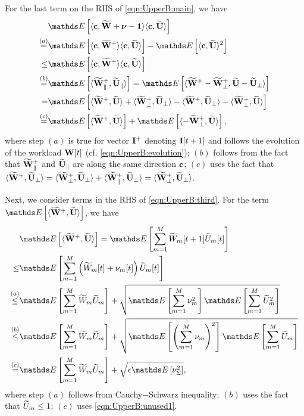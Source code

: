 \documentclass[10pt, conference, letterpaper]{IEEEtran} %
\begin{document}
For the last term on the RHS of \eqref{eqn:UpperB:main}, we have
\begin{align}
\label{eqn:UpperB:third}
&\bE\left[\langle\mb{c},\wt{\mb{W}}+\bs{\nu}-\mb{1}\rangle\langle\mb{c},\wt{\mb{U}}\rangle\right] \nonumber\\
\stackrel{(a)}{=}&\bE\left[\langle\mb{c},\wt{\mb{W}}^{+}\rangle\langle\mb{c},\wt{\mb{U}}\rangle\right]-\bE\left[\langle\mb{c},\wt{\mb{U}}\rangle^2\right]\nonumber\\
\leq&\bE\left[\langle\mb{c},\wt{\mb{W}}^{+}\rangle\langle\mb{c},\wt{\mb{U}}\rangle\right]\nonumber\\
\stackrel{(b)}{=}&\bE\left[\langle\wt{\mb{W}}^{+}_{\parallel},\wt{\mb{U}}_{\parallel}\rangle\right] =\bE\left[\langle\wt{\mb{W}}^{+}-\wt{\mb{W}}^{+}_{\perp},\wt{\mb{U}}-\wt{\mb{U}}_{\perp}\rangle\right]\nonumber\\
=&\bE\left[\langle\wt{\mb{W}}^{+},\wt{\mb{U}}\rangle+\langle\wt{\mb{W}}^{+}_{\perp},\wt{\mb{U}}_{\perp}\rangle-\langle\wt{\mb{W}}^{+},\wt{\mb{U}}_{\perp}\rangle-\langle\wt{\mb{W}}_{\perp}^{+},\wt{\mb{U}}\rangle\right]\nonumber\\
\stackrel{(c)}{=}&\bE\left[\langle\wt{\mb{W}}^{+},\wt{\mb{U}}\rangle\right]+\bE\left[\langle-\wt{\mb{W}}^{+}_{\perp},\wt{\mb{U}}\rangle\right],
\end{align}
where step $(a)$ is true for vector $\mathbf{I}^{+}$ denoting $\mathbf{I}[t+1]$ and follows the evolution of the workload $\mathbf{W}[t]$ (cf. \eqref{eqn:UpperB:evolution}); $(b)$ follows from the fact that $\widetilde{\mathbf{W}}_{\parallel}^{+}$ and $\widetilde{\mathbf{U}}_{\parallel}$ are along the same direction $\mathbf{c}$; $(c)$ uses the fact that $\langle\widetilde{\mathbf{W}}^{+},\widetilde{\mathbf{U}}_{\perp}\rangle=\langle\widetilde{\mathbf{W}}^{+}_{\perp},\widetilde{\mathbf{U}}_{\perp}\rangle+\langle\widetilde{\mathbf{W}}^{+}_{\parallel},\widetilde{\mathbf{U}}_{\perp}\rangle=\langle\widetilde{\mathbf{W}}^{+}_{\perp},\widetilde{\mathbf{U}}_{\perp}\rangle$.

Next, we consider terms in the RHS of \eqref{eqn:UpperB:third}. For the term $\bE\left[\langle\wt{\mb{W}}^{+},\wt{\mb{U}}\rangle\right]$, we have 
\begin{align}
\label{eqn:UpperB:third:temp1}
&\bE\left[\langle\wt{\mb{W}}^{+},\wt{\mb{U}}\rangle\right]=\bE\left[\sum_{m=1}^{M}\wt{W}_m[t+1]\wt{U}_m[t]\right]\nonumber\\
\leq&\bE\left[\sum_{m=1}^{M}\left(\wt{W}_m[t]+\nu_m[t]\right)\wt{U}_m[t]\right]\nonumber\\
\stackrel{(a)}{\leq}&\bE\left[\sum_{m=1}^{M}\wt{W}_m\wt{U}_m\right]+\sqrt{\bE\left[\sum_{m=1}^{M}\nu_m^2\right]\bE\left[\sum_{m=1}^{M}\wt{U}_m^2\right]}\nonumber\\
\stackrel{(b)}{\leq}&\bE\left[\sum_{m=1}^{M}\wt{W}_m\wt{U}_m\right]+\sqrt{\bE\left[\left(\sum_{m=1}^{M}\nu_m\right)^2\right]\bE\left[\sum_{m=1}^{M}\wt{U}_m\right]}\nonumber\\
\stackrel{(c)}{=}&\bE\left[\sum_{m=1}^{M}\wt{W}_m\wt{U}_m\right]+\sqrt{\epsilon\bE\left[\nu_{\Sigma}^2\right]},
\end{align}
where step $(a)$ follows from Cauchy$-$Schwarz inequality; $(b)$ uses the fact that $\widetilde{U}_m\leq1$; $(c)$ uses \eqref{eqn:UpperB:unused1}.
\end{document}
